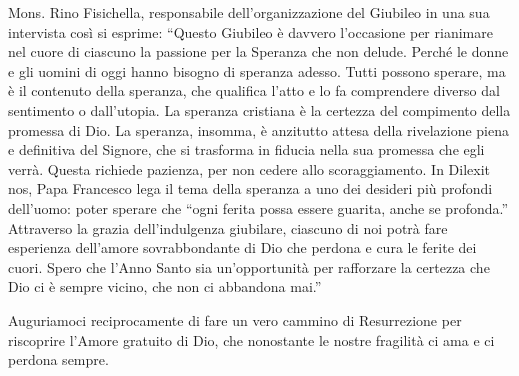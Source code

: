 Mons. Rino Fisichella, responsabile dell'organizzazione del Giubileo in una sua intervista così si esprime: ``Questo Giubileo è davvero l'occasione per rianimare nel cuore di ciascuno la passione per la Speranza che non delude. Perché le donne e gli uomini di oggi hanno bisogno di speranza adesso. Tutti possono sperare, ma è il contenuto della speranza, che qualifica l'atto e lo fa comprendere diverso dal sentimento o dall'utopia. La speranza cristiana è la certezza del compimento della promessa di Dio. La speranza, insomma, è anzitutto attesa della rivelazione piena e definitiva del Signore, che si trasforma in fiducia nella sua promessa che egli verrà. Questa richiede pazienza, per non cedere allo scoraggiamento. In Dilexit nos, Papa Francesco lega il tema della speranza a uno dei desideri più profondi dell'uomo: poter sperare che ``ogni ferita possa essere guarita, anche se profonda.'' Attraverso la grazia dell'indulgenza giubilare, ciascuno di noi potrà fare esperienza dell'amore sovrabbondante di Dio che perdona e cura le ferite dei cuori. Spero che l'Anno Santo sia un'opportunità per rafforzare la certezza che Dio ci è sempre vicino, che non ci abbandona mai.''

Auguriamoci reciprocamente di fare un vero cammino di Resurrezione per riscoprire l'Amore gratuito di Dio, che nonostante le nostre fragilità ci ama e ci perdona sempre.


